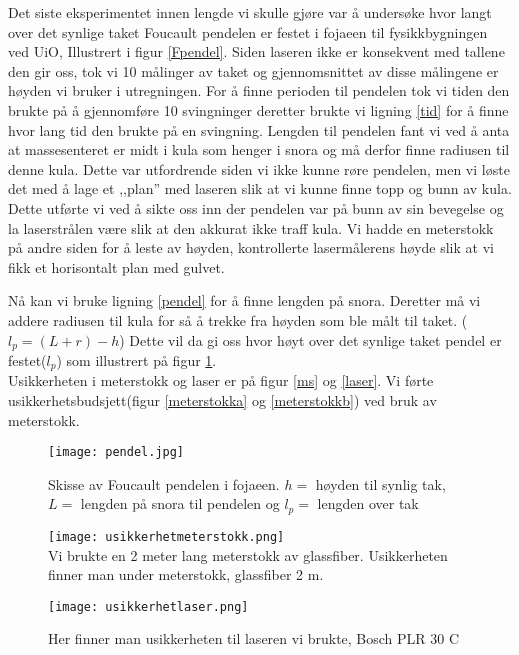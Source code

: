 \documentclass[norsk,a4paper,12pt]{article}
\begin{document}
Det siste eksperimentet innen lengde vi skulle gjøre var å undersøke hvor langt over det synlige taket Foucault pendelen er festet i fojaeen til fysikkbygningen ved UiO, Illustrert i figur \vref{Fpendel}. Siden laseren ikke er konsekvent med tallene den gir oss, tok vi 10 målinger av taket og gjennomsnittet av disse målingene er høyden vi bruker i utregningen.  For å finne perioden til pendelen tok vi tiden den brukte på å gjennomføre 10 svingninger deretter brukte vi ligning \ref{tid} for å finne hvor lang tid den brukte på en svingning. Lengden til pendelen fant vi ved å anta at massesenteret er midt i kula som henger i snora og må derfor finne radiusen til denne kula. Dette var utfordrende siden vi ikke kunne røre pendelen, men vi løste det med å lage et ,,plan'' med laseren slik at vi kunne finne topp og bunn av kula. Dette utførte vi ved å sikte oss inn der pendelen var på bunn av sin bevegelse og la laserstrålen være slik at den akkurat ikke traff kula. Vi hadde en meterstokk på andre siden for å leste av høyden, kontrollerte lasermålerens høyde slik at vi fikk et horisontalt plan med gulvet. 

Nå kan vi bruke ligning \ref{pendel} for å finne lengden på snora. Deretter må vi addere radiusen til kula for så å trekke fra høyden som ble målt til taket. ($l_{p} = (L+r)-h$) Dette vil da gi oss hvor høyt over det synlige taket pendel er festet($l_p$) som illustrert på figur \ref{Fpendel}. \\

Usikkerheten i meterstokk og laser er på figur \ref{ms} og \vref{laser}. Vi førte usikkerhetsbudsjett(figur \ref{meterstokka} og \vref{meterstokkb}) ved bruk av meterstokk. \\

\begin{figure}
\begin{center}
  \texttt{[image: pendel.jpg]}\\
  \caption[Illustrasjojn av Foucault pendel]{Skisse av Foucault pendelen i fojaeen. $h=$ høyden til synlig tak, $L=$ lengden på snora til pendelen og $l_p =$ lengden over tak}
  \label{Fpendel}
  \end{center}
\end{figure}

\begin{figure}
	\begin{minipage}{.5\linewidth}
	\texttt{[image: usikkerhetmeterstokk.png]}\\
  	\caption[Toleranse for meterstokken]{Vi brukte en 2 meter lang meterstokk av glassfiber.
	Usikkerheten finner man under meterstokk, glassfiber 2 m.}
  	\label{ms}
	\end{minipage}
	\hspace{0.5cm}
	\begin{minipage}{.5\linewidth}
  	\texttt{[image: usikkerhetlaser.png]}\\
 	 \caption[Toleranse for laser]{Her finner man usikkerheten til laseren vi brukte, Bosch PLR 30
	 C}
	\label{laser}
	\end{minipage}
\end{figure}
\end{document}
